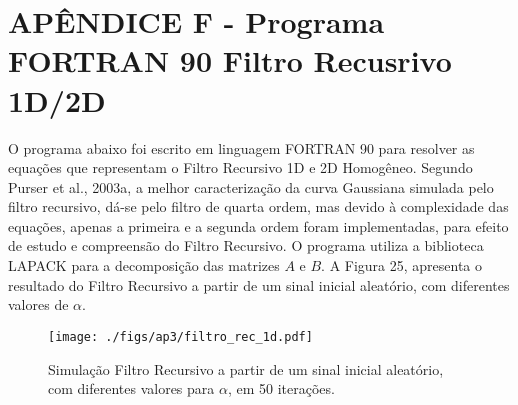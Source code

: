 
\chapter{APÊNDICE F - Programa FORTRAN 90 Filtro Recusrivo 1D/2D}
\label{apendiceVI}

O programa abaixo foi escrito em linguagem FORTRAN 90 para resolver as equações que representam o Filtro Recursivo 1D e 2D Homogêneo. Segundo Purser et al., 2003a, a melhor caracterização da curva Gaussiana simulada pelo filtro recursivo, dá-se pelo filtro de quarta ordem, mas devido à complexidade das equações, apenas a primeira e a segunda ordem foram implementadas, para efeito de estudo e compreensão do Filtro Recursivo. O programa utiliza a biblioteca LAPACK para a decomposição das matrizes $A$ e $B$. A Figura 25, apresenta o resultado do Filtro Recursivo a partir de um sinal inicial aleatório, com diferentes valores de $\alpha$.

\begin{figure}[!h]
\centering
\texttt{[image: ./figs/ap3/filtro\_rec\_1d.pdf]}
\caption{Simulação Filtro Recursivo a partir de um sinal inicial aleatório, com diferentes valores para $\alpha$, em 50 iterações.}
\end{figure}





